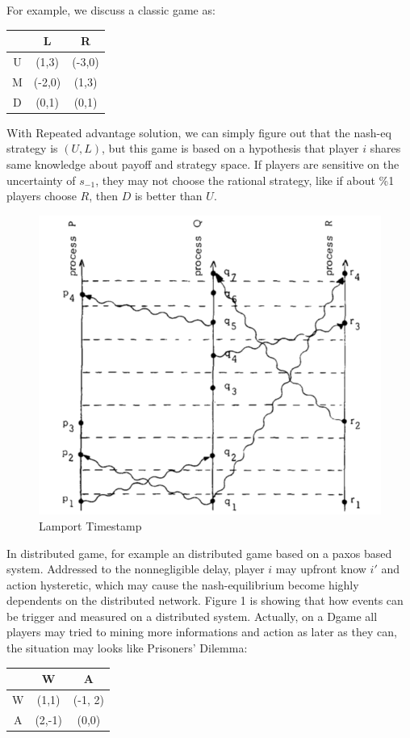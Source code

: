 \documentclass[twocolumn]{article}
\begin{document}
For example, we discuss a classic game as:
\begin{center}
\begin{tabular}{c|c|c|}
  & L & R \\
  \hline
  U & (1,3)&(-3,0)\\
  \hline
  M & (-2,0)&(1,3)\\
  \hline
  D & (0,1)&(0,1)\\
\end{tabular}
\end{center}

With Repeated advantage solution, we can simply figure out that the nash-eq strategy is $(U, L)$, but this game is based on a hypothesis that player $i$ shares same knowledge about payoff and strategy space. If players are sensitive on the uncertainty of $s_{-1}$, they may not choose the rational strategy, like if about \%1 players choose $R$, then $D$ is better than $U$.


\begin{figure}[H]
  \centering
  \includegraphics[width=0.5\linewidth]{img/lamportts.png}
  \caption{Lamport Timestamp}
\end{figure}


In distributed game, for example an distributed game based on a paxos based system. Addressed to the nonnegligible delay, player $i$ may upfront know $i'$ and action hysteretic, which may cause the nash-equilibrium become highly dependents on the distributed network. Figure 1 is showing that how events can be trigger and measured on a distributed system. Actually, on a Dgame all players may tried to mining more informations and action as later as they can, the situation may looks like Prisoners’ Dilemma:

\begin{center}
\begin{tabular}{c|c|c|}
  & W & A \\
  \hline
  W & (1,1)&(-1, 2)\\
  \hline
  A & (2,-1)&(0,0)\\
\end{tabular}
\end{center}
\end{document}
